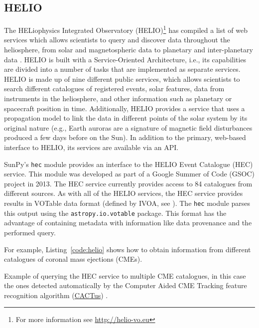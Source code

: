 \subsection{HELIO}\label{ssec:helio}

The HELiophysics Integrated Observatory (HELIO)\footnote{For more information 
see \url{http://helio-vo.eu}} has 
compiled a list of web services which allows scientists to query and 
discover data throughout the heliosphere, from solar and magnetospheric data to planetary and 
inter-planetary data \citep{perez-suarez2012}.
HELIO is built with a Service-Oriented Architecture, 
i.e., its capabilities are divided into a number of tasks that are 
implemented as separate services. 
HELIO is made up of nine different public services, 
which allows scientists to search different catalogues of registered events, 
solar features, data from instruments in the heliosphere, and other information 
such as planetary or spacecraft position in time. 
Additionally, HELIO provides a service that uses a 
propagation model to link the data in different points of the solar system by 
its original nature (e.g., Earth auroras are a signature of magnetic 
field disturbances produced a few days before on the Sun).
In addition to the primary, web-based interface to 
HELIO, its services are available via an API.

SunPy's \texttt{hec} module provides an interface to the
HELIO Event Catalogue (HEC) service. 
This module was developed as
part of a Google Summer of Code (GSOC) project in 2013.
The HEC service currently provides access to 84 catalogues from different
sources.
As with all of the HELIO services, the HEC service provides results in VOTable 
data format (defined by IVOA, see \citealt{ochsenbein2011}).
The \texttt{hec} module parses this output using the \texttt{astropy.io.votable} package.
This format has the advantage of containing metadata with information like
data provenance and the performed query.

For example, Listing~\ref{code:helio} shows how to obtain information
from different catalogues of coronal mass ejections (CMEs).

\begin{listing}[h]
\caption{Example of querying the HEC service to multiple CME
catalogues, in this case the ones detected automatically 
by the Computer Aided CME Tracking feature recognition algorithm (\href{http://sidc.oma.be/cactus/}{CACTus}) \citep{robbrecht_automated_2009}.}
\label{code:helio}
\end{listing}